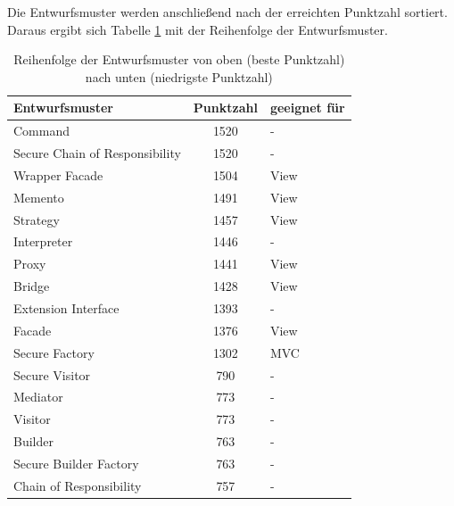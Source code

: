 Die Entwurfsmuster werden anschließend nach der erreichten Punktzahl sortiert. Daraus ergibt sich Tabelle \ref{tab:reihenfolge_pattern} mit der Reihenfolge der Entwurfsmuster.

\begin{table}[hp]
	\caption[Reihenfolge Entwrufsmuster]{Reihenfolge der Entwurfsmuster von oben (beste Punktzahl) nach unten (niedrigste Punktzahl)}
	\label{tab:reihenfolge_pattern}
	\centering
	\small
	\begin{tabular}{|l|c|l|}
		\hline
		Entwurfsmuster                 & Punktzahl & geeignet für      \\ \hline
		Command                        &   1520    & -                 \\ \hline
		Secure Chain of Responsibility &   1520    & -                 \\ \hline
		Wrapper Facade                 &   1504    & View              \\ \hline
		Memento                        &   1491    & View              \\ \hline
		Strategy                       &   1457    & View              \\ \hline
		Interpreter                    &   1446    & -                 \\ \hline
		Proxy                          &   1441    & View              \\ \hline
		Bridge                         &   1428    & View              \\ \hline
		Extension Interface            &   1393    & -                 \\ \hline
		Facade                         &   1376    & View              \\ \hline
		Secure Factory                 &   1302    & MVC               \\ \hline
		Secure Visitor                 &    790    & -                 \\ \hline
		Mediator                       &    773    & -                 \\ \hline
		Visitor                        &    773    & -                 \\ \hline
		Builder                        &    763    & -                 \\ \hline
		Secure Builder Factory         &    763    & -                 \\ \hline
		Chain of Responsibility        &    757    & -                 \\ \hline

\end{tabular}
\end{table}
